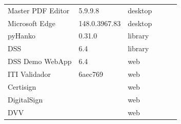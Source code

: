 \documentclass[12pt]{article}
\begin{document}
\begin{table}[htb]
\begin{tabular}{@{}lllccc@{}}
		Master PDF Editor                                           & 5.9.9.8          & desktop           & \CIRCLE\hspace{4pt}\CIRCLE     & \CIRCLE\hspace{4pt}\CIRCLE     &                            \\
		Microsoft Edge                                              & 148.0.3967.83    & desktop           & \CIRCLE\hspace{4pt}\CIRCLE     & \CIRCLE\hspace{4pt}\CIRCLE     &                            \\
		pyHanko                                                     & 0.31.0           & library           &                                &                                & \Circle\hspace{4pt}\CIRCLE \\
		DSS                                                         & 6.4              & library           &                                &                                & \CIRCLE\hspace{4pt}\Circle \\
		DSS Demo WebApp                                             & 6.4              & web               & \LEFTcircle\hspace{4pt}\Circle & \LEFTcircle\hspace{4pt}\Circle &                            \\
		ITI Validador                                               & 6aec769          & web               & \CIRCLE\hspace{4pt}\Circle     & \CIRCLE\hspace{4pt}\Circle     &                            \\
		Certisign                                                   &                  & web               & \CIRCLE\hspace{4pt}\CIRCLE     & \CIRCLE\hspace{4pt}\CIRCLE     &                            \\
		DigitalSign                                                 &                  & web               & \LEFTcircle\hspace{4pt}\Circle & \LEFTcircle\hspace{4pt}\Circle &                            \\
		DVV                                                         &                  & web               & \LEFTcircle\hspace{4pt}\Circle & \LEFTcircle\hspace{4pt}\Circle &                            \\

\end{tabular}
\end{table}
\end{document}
